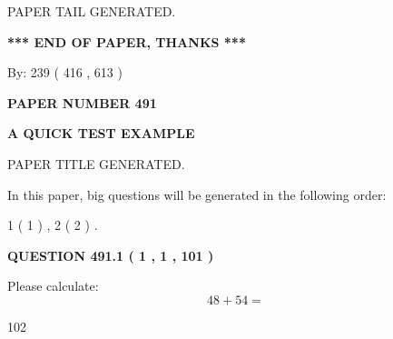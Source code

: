 \documentclass[12pt]{article}
\begin{document}
\vspace{2.0in} PAPER TAIL GENERATED.
   
   
   
   
\vspace{1.0in} 
{\textbf{\large{ *** END OF PAPER, THANKS *** }}} 
   
   
\hspace{1.0in} By: 
 239 ( 416 ,  613 )
   
   
   
   
\newpage 
\setcounter{page}{ 
   491001 } 
   
   
   
   
 {\textbf{ \Large{ PAPER NUMBER  491  }}}
   
   
\vspace{0.2in}
   
   
   
   
   
   
   
   
 \vspace{0.2in}
{\LARGE {\textbf{ A QUICK TEST EXAMPLE}}}
   
   
 PAPER TITLE GENERATED.
   
   
   
\vspace{0.2in}
   
In this paper, big questions will be generated in the following order: 
   
   
   1 ( 1 )
 ,
   2 ( 2 )
 .
  
\vspace{0.2in}
  
{\textbf{\Large{QUESTION
491.1 
 ( 1 , 1 , 101 )
}}}
  
  
 
Please calculate:
\begin{equation}
48 +  %
54 = \nonumber
\end{equation}
 
 
 
\noindent{}
 
 

102
 
 
\noindent{}
 
 

 
 
\end{document}
